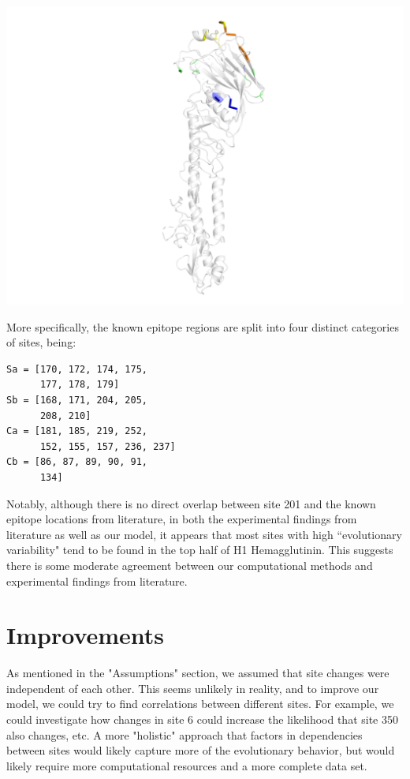 \documentclass[12pt]{article}
\newenvironment{Figure}
  {\par\medskip\noindent\minipage{\linewidth}}
  {\endminipage\par\medskip}
\begin{document}
\begin{multicols}{2}
\begin{Figure}
 \centering
 \includegraphics[width=\linewidth]{expEpi_viewA.png}
\end{Figure}

More specifically, the known epitope regions are split into four distinct categories of sites, being:
\begin{verbatim}
Sa = [170, 172, 174, 175,
      177, 178, 179]
Sb = [168, 171, 204, 205,
      208, 210]
Ca = [181, 185, 219, 252,
      152, 155, 157, 236, 237]
Cb = [86, 87, 89, 90, 91,
      134]
\end{verbatim}

Notably, although there is no direct overlap between site 201 and the known epitope locations from literature, in both the experimental findings from literature as well as our model, it appears that most sites with high ``evolutionary variability" tend to be found in the top half of H1 Hemagglutinin. This suggests there is some moderate agreement between our computational methods and experimental findings from literature.

\section{Improvements}
As mentioned in the "Assumptions" section, we assumed that site changes were independent of each other. This seems unlikely in reality, and to improve our model, we could try to find correlations between different sites. For example, we could investigate how changes in site 6 could increase the likelihood that site 350 also changes, etc. A more "holistic" approach that factors in dependencies between sites would likely capture more of the evolutionary behavior, but would likely require more computational resources and a more complete data set. 


\end{multicols}
\end{document}
